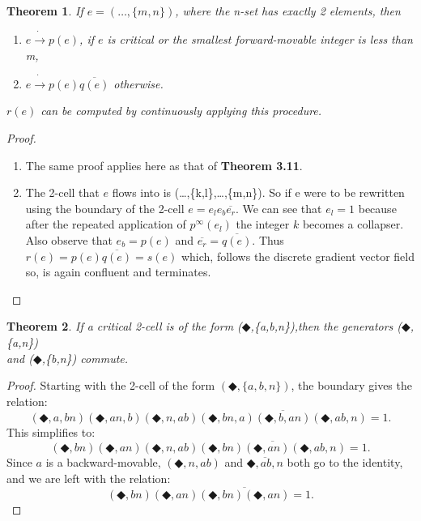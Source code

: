 \documentclass{amsart}
\newtheorem{theorem}{Theorem}[section]
\begin{document}
\begin{theorem}
If $e=(\ldots,\{m,n\})$, where the n-set has exactly 2 elements, then
\begin{enumerate}
\item $e\dot{\rightarrow}p(e)$, if $e$ is critical or the smallest forward-movable integer is less than m,
\item $e\dot{\rightarrow}p(e)\overline{q(e)}$ otherwise.
\end{enumerate}
$r(e)$ can be computed by continuously applying this procedure.
\end{theorem}

\begin{proof}
\noindent
\begin{enumerate}
\item The same proof applies here as that of \textbf{Theorem 3.11}. %
\item The 2-cell that $e$ flows into is (\ldots,\{k,l\},\ldots,\{m,n\}). So if e were to be rewritten using the boundary of the 2-cell $e=e_{l}e_{b}\overline{e_{r}}$. We can see that $e_{l}=1$ because after the repeated application of $p^{\infty}(e_{l})$ the integer $k$ becomes a collapser. Also observe that $e_{b}=p(e)$ and  $\overline{e_{r}}=\overline{q(e)}$. Thus $r(e)=p(e)\overline{q(e)}=s(e)$ which,
follows the discrete gradient vector field so, is again confluent and terminates.
\end{enumerate}
\end{proof}

\begin{theorem}
If a critical 2-cell is of the form ($\Diamondblack$,\{a,b,n\}),then the generators ($\Diamondblack$,\{a,n\})\\
and ($\Diamondblack$,\{b,n\}) commute.
\end{theorem}

\begin{proof}
Starting with the 2-cell of the form $(\Diamondblack,\{a,b,n\})$, the boundary gives the relation:
\begin{equation*}
(\Diamondblack,a,bn)(\Diamondblack,an,b)(\Diamondblack,n,ab)\overline{(\Diamondblack,bn,a)(\Diamondblack,b,an)(\Diamondblack,ab,n)}=1.
\end{equation*}
This simplifies to:
\begin{equation*}
(\Diamondblack,bn)(\Diamondblack,an)(\Diamondblack,n,ab)\overline{(\Diamondblack,bn)(\Diamondblack,an)(\Diamondblack,ab,n)}=1.
\end{equation*}
Since $a$ is a backward-movable, $(\Diamondblack,n,ab)$ and $\overline{\Diamondblack,ab,n}$ both go to the identity, and we are left with the relation:
\begin{equation*}
(\Diamondblack,bn)(\Diamondblack,an)\overline{(\Diamondblack,bn)(\Diamondblack,an)}=1.
\end{equation*}
\end{proof}
\end{document}
